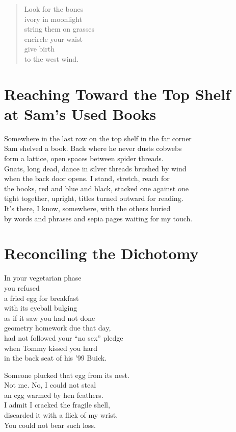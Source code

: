 \documentclass[twoside,10pt]{book}
\begin{document}
\begin{quote}
Look for the bones\\
ivory in moonlight\\
string them on grasses\\
encircle your waist\\
give birth\\
to the west wind.
\end{quote}


\clearpage
\section{Reaching Toward the Top Shelf\\
at Sam's Used Books}

Somewhere in the last row on the top shelf in the far corner\\
Sam shelved a book. Back where he never dusts cobwebs\\
form a lattice, open spaces between spider threads.\\
Gnats, long dead, dance in silver threads brushed by wind\\
when the back door opens. I stand, stretch, reach for\\
the books, red and blue and black, stacked one against one\\
tight together, upright, titles turned outward for reading.\\
It's there, I know, somewhere, with the others buried\\
by words and phrases and sepia pages waiting for my touch.


\clearpage
\section{Reconciling the Dichotomy}

In your vegetarian phase\\
you refused\\
a fried egg for breakfast\\
with its eyeball bulging\\
as if it saw you had not done\\
geometry homework due that day,\\
had not followed your ``no sex'' pledge\\
when Tommy kissed you hard\\
in the back seat of his '99 Buick.

Someone plucked that egg from its nest.\\
Not me. No, I could not steal\\
an egg warmed by hen feathers.\\
I admit I cracked the fragile shell,\\
discarded it with a flick of my wrist.\\
You could not bear such loss.
\end{document}
